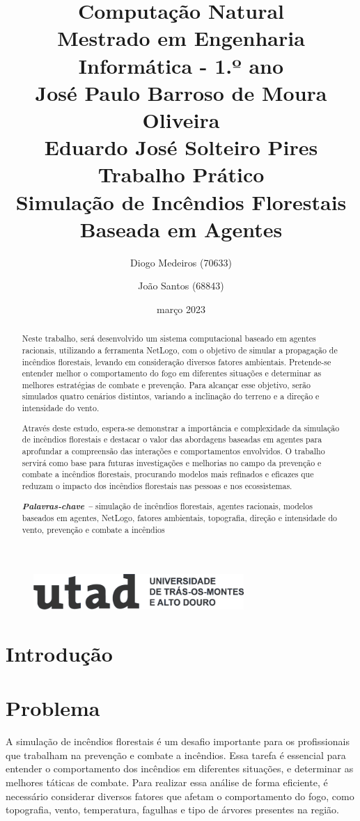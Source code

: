 \documentclass[a4paper, portuguese]{report}
\title{{\bf Computação Natural}\\ Mestrado em Engenharia Informática - 1.º ano\\ \vspace*{1cm} José Paulo Barroso de Moura Oliveira\\ Eduardo José Solteiro Pires\\ \vspace*{3cm}\textbf{Trabalho Prático}\\ Simulação de Incêndios Florestais Baseada em Agentes \vspace*{1cm}}
\author{Diogo Medeiros (70633) \and João Santos (68843)}
\date{março 2023}
\providecommand{\keywords}[1]
{
  \small	
  \textbf{\textit{Palavras-chave --}} #1
}
\begin{document}
\begin{figure}
\includegraphics[width=8cm]{paper/images/utad.png}
\end{figure}

\maketitle

\begin{abstract}

Neste trabalho, será desenvolvido um sistema computacional baseado em agentes racionais, utilizando a ferramenta NetLogo, com o objetivo de simular a propagação de incêndios florestais, levando em consideração diversos fatores ambientais. Pretende-se entender melhor o comportamento do fogo em diferentes situações e determinar as melhores estratégias de combate e prevenção. Para alcançar esse objetivo, serão simulados quatro cenários distintos, variando a inclinação do terreno e a direção e intensidade do vento.

Através deste estudo, espera-se demonstrar a importância e complexidade da simulação de incêndios florestais e destacar o valor das abordagens baseadas em agentes para aprofundar a compreensão das interações e comportamentos envolvidos. O trabalho servirá como base para futuras investigações e melhorias no campo da prevenção e combate a incêndios florestais, procurando modelos mais refinados e eficazes que reduzam o impacto dos incêndios florestais nas pessoas e nos ecossistemas.

\keywords{simulação de incêndios florestais, agentes racionais, modelos baseados em agentes, NetLogo, fatores ambientais, topografia, direção e intensidade do vento, prevenção e combate a incêndios}

\end{abstract}

\tableofcontents
\listoffigures
\listoftables
\listofalgorithms

\chapter{Introdução}\label{chapter:introduction}


\chapter{Problema}\label{chapter:problem}
A simulação de incêndios florestais é um desafio importante para os profissionais que trabalham na prevenção e combate a incêndios. Essa tarefa é essencial para entender o comportamento dos incêndios em diferentes situações, e determinar as melhores táticas de combate. Para realizar essa análise de forma eficiente, é necessário considerar diversos fatores que afetam o comportamento do fogo, como topografia, vento, temperatura, fagulhas e tipo de árvores presentes na região.
\end{document}
